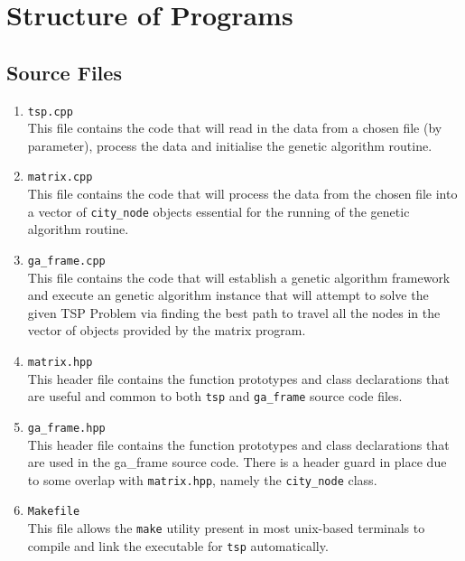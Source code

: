 \documentclass[12pt]{article}
\begin{document}
\section{Structure of Programs}
\subsection{Source Files}

\begin{enumerate}
	\item \texttt{tsp.cpp}\\
	This file contains the code that will read in the data from a chosen file (by parameter), process the data and initialise the genetic algorithm routine.
	
	\item \texttt{matrix.cpp}\\
	This file contains the code that will process the data from the chosen file into a vector of \texttt{city\_node} objects essential for the running of the genetic algorithm routine.
	
	\item \texttt{ga\_frame.cpp}\\
	This file contains the code that will establish a genetic algorithm framework and execute an genetic algorithm instance that will attempt to solve the given TSP Problem via finding the best path to travel all the nodes in the vector of objects provided by the matrix program.
	
	\item \texttt{matrix.hpp}\\
	This header file contains the function prototypes and class declarations that are useful and common to both \texttt{tsp} and \texttt{ga\_frame} source code files.
	
	\item \texttt{ga\_frame.hpp}\\
	This header file contains the function prototypes and class declarations that are used in the ga\_frame source code. There is a header guard in place due to some overlap with \texttt{matrix.hpp}, namely the \texttt{city\_node} class.
	
	\item \texttt{Makefile}\\
	This file allows the \texttt{make} utility present in most unix-based terminals to compile and link the executable for \texttt{tsp} automatically.
	
\end{enumerate}
\end{document}
